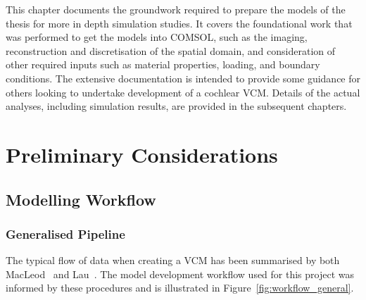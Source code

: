 This chapter documents the groundwork required to prepare the models of the
thesis for more in depth simulation studies. It covers the foundational work
that was performed to get the models into COMSOL, such as the imaging,
reconstruction and discretisation of the spatial domain, and consideration of
other required inputs such as material properties, loading, and boundary
conditions. The extensive documentation is intended to provide some guidance for
others looking to undertake development of a cochlear VCM. Details of the actual
analyses, including simulation results, are provided in the subsequent chapters.

\section{Preliminary Considerations}

\subsection{Modelling Workflow}

\subsubsection{Generalised Pipeline}

The typical flow of data when creating a VCM has been summarised by both
MacLeod~\cite{macleod2009} and Lau~\cite{lau2011}. The model development
workflow used for this project was informed by these procedures and is
illustrated in Figure~\ref{fig:workflow_general}.

